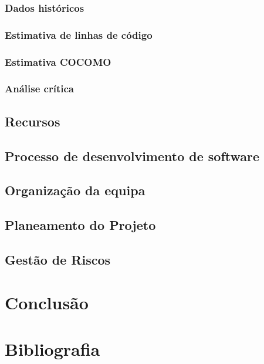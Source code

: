 \documentclass[a4paper]{report}
\begin{document}
\subsection{Dados históricos}
\subsection{Estimativa de linhas de código}
\subsection{Estimativa COCOMO}
\subsection{Análise crítica}
\section{Recursos}
\section{Processo de desenvolvimento de software}
\section{Organização da equipa}
\section{Planeamento do Projeto}
\section{Gestão de Riscos}
\chapter{Conclusão}
\chapter{Bibliografia }
\end{document}
